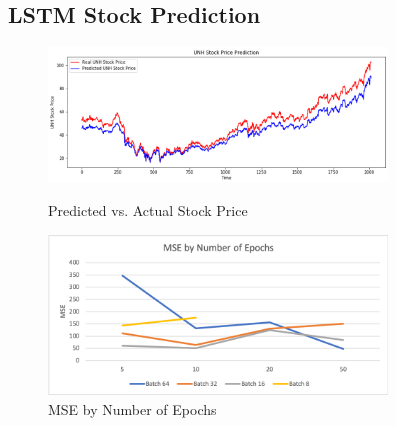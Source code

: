 \documentclass{article}
\begin{document}
\subsection{LSTM Stock Prediction}
\begin{figure}
\begin{minipage}{0.5\textwidth}
    \centering
    \includegraphics[width=9cm]{LSTMResult.png}
    \caption{Predicted vs. Actual Stock Price}
    \label{fig:LSTMForecast}
\end{minipage}
\begin{minipage}{0.5\textwidth}
    \centering
    \includegraphics[width=9cm]{LSTMMSE.png}
    \caption{MSE by Number of Epochs}
    \label{fig:LSTMResult}
\end{minipage}
\end{figure}
\end{document}
